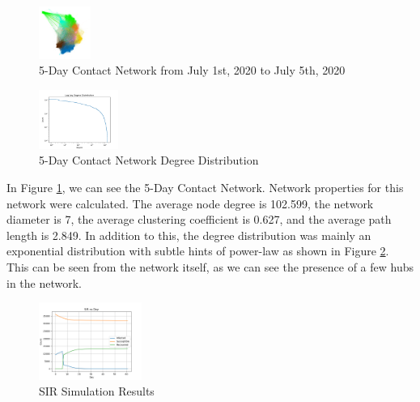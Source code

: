 \documentclass[times, 10pt,twocolumn]{article}
\begin{document}
\vspace{-15pt}
\begin{figure}[h]
    \centering
    \includegraphics[width=0.15\textwidth]{imgs/5_day_network.png}
    \caption{5-Day Contact Network from July 1st, 2020 to July 5th, 2020}
    \label{fig:my_label}
\end{figure}

\vspace{-15pt}
\begin{figure}[h]
    \centering
    \includegraphics[width=0.23\textwidth]{imgs/5_day_log_log_degree_distribution.png}
    \caption{5-Day Contact Network Degree Distribution}
    \label{fig:deg_dist}
\end{figure}

In Figure \ref{fig:my_label}, we can see the 5-Day Contact Network. Network properties for this network were calculated. The average node degree is 102.599, the network diameter is 7, the average clustering coefficient is 0.627, and the average path length is 2.849. In addition to this, the degree distribution was mainly an exponential distribution with subtle hints of power-law as shown in Figure \ref{fig:deg_dist}. This can be seen from the network itself, as we can see the presence of a few hubs in the network.



\begin{figure}[h]
    \centering
    \includegraphics[width=0.30\textwidth]{imgs/complete_simulation.png}
    \caption{SIR Simulation Results}
    \label{fig:simulation_results}
\end{figure}
\end{document}
